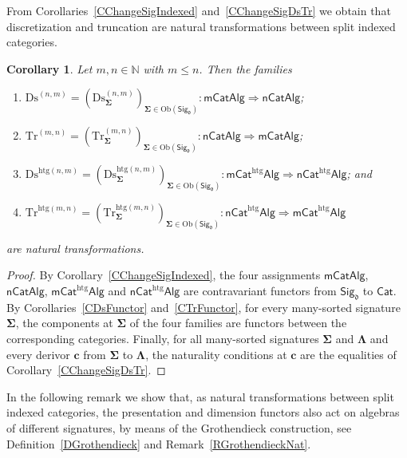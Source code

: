 \documentclass[a4paper, reqno]{amsbook}
\newcommand{\sig}[1]{\mathbf{#1}}             %
\newcommand{\htg}{\mathrm{htg}}                %
\newcommand{\Ds}{\mathrm{Ds}}
\newcommand{\Tr}{\mathrm{Tr}}
\theoremstyle{plain}
\newtheorem{corollary}[theorem]{Corollary}
\theoremstyle{definition}
\begin{document}
From Corollaries~\ref{CChangeSigIndexed} and~\ref{CChangeSigDsTr} we obtain that discretization and truncation are natural transformations between split indexed categories.

\begin{corollary}\label{CChangeSigDsTrNat}
Let $m,n\in\mathbb{N}$ with $m\leq n$.
Then the families
\begin{enumerate}
	\item 
	$\Ds^{(n,m)}=(\Ds^{(n,m)}_{\sig{\Sigma}})_{\sig{\Sigma} \in \mathrm{Ob}(\mathsf{Sig}_{\mathfrak{d}})}\colon\mathsf{mCatAlg}\Longrightarrow\mathsf{nCatAlg}$;
	
	\item
	$\Tr^{(m,n)}=(\Tr^{(m,n)}_{\sig{\Sigma}})_{\sig{\Sigma} \in \mathrm{Ob}(\mathsf{Sig}_{\mathfrak{d}})}\colon\mathsf{nCatAlg}\Longrightarrow\mathsf{mCatAlg}$;
	
	\item 
	$\Ds^{\htg(n,m)}=(\Ds^{\htg(n,m)}_{\sig{\Sigma}})_{\sig{\Sigma} \in \mathrm{Ob}(\mathsf{Sig}_{\mathfrak{d}})}\colon\mathsf{mCat}^{\htg}\mathsf{Alg}\Longrightarrow\mathsf{nCat}^{\htg}\mathsf{Alg}$; and
	
	\item 
	$\Tr^{\htg(m,n)}=(\Tr^{\htg(m,n)}_{\sig{\Sigma}})_{\sig{\Sigma} \in \mathrm{Ob}(\mathsf{Sig}_{\mathfrak{d}})}\colon\mathsf{nCat}^{\htg}\mathsf{Alg}\Longrightarrow\mathsf{mCat}^{\htg}\mathsf{Alg}$
\end{enumerate}
are natural transformations.
\end{corollary}
\begin{proof}
By Corollary~\ref{CChangeSigIndexed}, the four assignments $\mathsf{mCatAlg}$, $\mathsf{nCatAlg}$, $\mathsf{mCat}^{\htg}\mathsf{Alg}$ and $\mathsf{nCat}^{\htg}\mathsf{Alg}$ are contravariant functors from $\mathsf{Sig}_{\mathfrak{d}}$ to $\mathsf{Cat}$.
By Corollaries~\ref{CDsFunctor} and~\ref{CTrFunctor}, for every many-sorted signature $\sig{\Sigma}$, the components at $\sig{\Sigma}$ of the four families are functors between the corresponding categories.
Finally, for all many-sorted signatures $\sig{\Sigma}$ and $\sig{\Lambda}$ and every derivor $\mathbf{c}$ from $\sig{\Sigma}$ to $\sig{\Lambda}$, the naturality conditions at $\mathbf{c}$ are the equalities of Corollary~\ref{CChangeSigDsTr}.
\end{proof}

In the following remark we show that, as natural transformations between split indexed categories, the presentation and dimension functors also act on algebras of different signatures, by means of the Grothendieck construction, see Definition~\ref{DGrothendieck} and Remark~\ref{RGrothendieckNat}.
\end{document}
